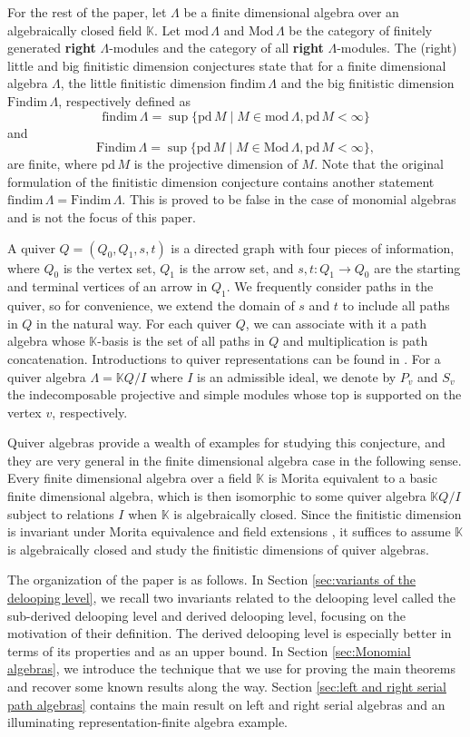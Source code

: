 \documentclass{conm-p-l}
\newcommand{\findim}{\mathrm{findim}\,}
\newcommand{\Findim}{\mathrm{Findim}\,}
\newcommand{\pd}{\mathrm{pd}\,}
\renewcommand{\k}{\mathbb{K}}
\renewcommand{\mod}{\mathrm{mod}\,}
\newcommand{\Mod}{\mathrm{Mod}\,}
\theoremstyle{definition}
\theoremstyle{remark}
\numberwithin{equation}{section}
\begin{document}
For the rest of the paper, let $\Lambda$ be a finite dimensional algebra over an algebraically closed field $\k$. Let $\mod\Lambda$ and $\Mod\Lambda$ be the category of finitely generated \textbf{right} $\Lambda$-modules and the category of all \textbf{right} $\Lambda$-modules. The (right) little and big finitistic dimension conjectures state that for a finite dimensional algebra $\Lambda$, the little finitistic dimension $\findim\Lambda$ and the big finitistic dimension $\Findim\Lambda$, respectively defined as
\[
\findim\Lambda = \sup \{\pd M\mid M\in\mod\Lambda, \pd M<\infty\}
\]
and
\[
\Findim\Lambda = \sup \{\pd M\mid M\in\Mod\Lambda, \pd M<\infty\},
\]
are finite, where $\pd M$ is the projective dimension of $M$. Note that the original formulation of the finitistic dimension conjecture contains another statement $\findim\Lambda=\Findim\Lambda$. This is proved to be false in the case of monomial algebras \cite{huisgen1992homological} and is not the focus of this paper.

A quiver $Q=(Q_0, Q_1, s, t)$ is a directed graph with four pieces of information, where $Q_0$ is the vertex set, $Q_1$ is the arrow set, and $s,t:Q_1\to Q_0$ are the starting and terminal vertices of an arrow in $Q_1$. We frequently consider paths in the quiver, so for convenience, we extend the domain of $s$ and $t$ to include all paths in $Q$ in the natural way. For each quiver $Q$, we can associate with it a path algebra whose $\k$-basis is the set of all paths in $Q$ and multiplication is path concatenation. Introductions to quiver representations can be found in \cite{assem2006elements, schiffler2014quiver}. For a quiver algebra $\Lambda=\k Q/I$ where $I$ is an admissible ideal, we denote by $P_v$ and $S_v$ the indecomposable projective and simple modules whose top is supported on the vertex $v$, respectively.

Quiver algebras provide a wealth of examples for studying this conjecture, and they are very general in the finite dimensional algebra case in the following sense. Every finite dimensional algebra over a field $\k$ is Morita equivalent to a basic finite dimensional algebra, which is then isomorphic to some quiver algebra $\k Q/I$ subject to relations $I$ when $\k$ is algebraically closed. Since the finitistic dimension is invariant under Morita equivalence and field extensions \cite{jensen1982homological}, it suffices to assume $\k$ is algebraically closed and study the finitistic dimensions of quiver algebras.

The organization of the paper is as follows. In Section \ref{sec:variants of the delooping level}, we recall two invariants related to the delooping level called the sub-derived delooping level and derived delooping level, focusing on the motivation of their definition. The derived delooping level is especially better in terms of its properties and as an upper bound. In Section \ref{sec:Monomial algebras}, we introduce the technique that we use for proving the main theorems and recover some known results along the way. Section \ref{sec:left and right serial path algebras} contains the main result on left and right serial algebras and an illuminating representation-finite algebra example.
\end{document}
